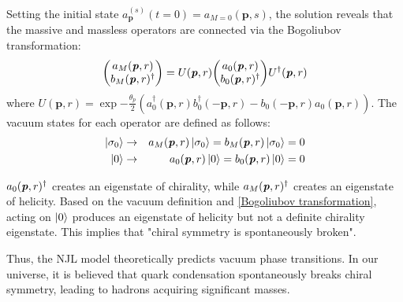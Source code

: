         Setting the initial state $a_{\bm{p}}^{(s)}(t=0) = a_{M=0}(\bm{p},s)$, the solution reveals that the massive and massless operators are connected via the Bogoliubov transformation:  
        \begin{eqnarray}
            \label{Bogoliubov transformation}
            \mqty(a_{M}(\textbf{\textit{p}},r)\\b_{M}(\textbf{\textit{p}},r)^{\dag})=U(\textbf{\textit{p}},r) \mqty(a_0(\textbf{\textit{p}},r)\\b_0(\textbf{\textit{p}},r)^{\dag})U^{\dag}(\textbf{\textit{p}},r)
        \end{eqnarray}
        where $U(\bm{p},r) = \exp{-\frac{\theta_p}{2}(a_0^\dag(\bm{p},r)b_0^\dag(-\bm{p},r) - b_0(-\bm{p},r)a_0(\bm{p},r))}$.  
        The vacuum states for each operator are defined as follows:  
        \begin{eqnarray}
            \ket{\sigma_0} &\rightarrow&a_M(\textbf{\textit{p}},r)\ket{\sigma_0}=b_M(\textbf{\textit{p}},r)\ket{\sigma_0}=0\\
            \ket{0} &\rightarrow& a_0(\textbf{\textit{p}},r)\ket{0}=b_0(\textbf{\textit{p}},r)\ket{0}=0
        \end{eqnarray}
        
       $a_0(\textbf{\textit{p}},r)^{\dag}$ creates an eigenstate of chirality, while $a_M(\textbf{\textit{p}},r)^{\dag}$ creates an eigenstate of helicity. Based on the vacuum definition and \eqref{Bogoliubov transformation}, acting on $\ket{0}$ produces an eigenstate of helicity but not a definite chirality eigenstate. This implies that "chiral symmetry is spontaneously broken".  
        
        Thus, the NJL model theoretically predicts vacuum phase transitions. In our universe, it is believed that quark condensation spontaneously breaks chiral symmetry, leading to hadrons acquiring significant masses.
